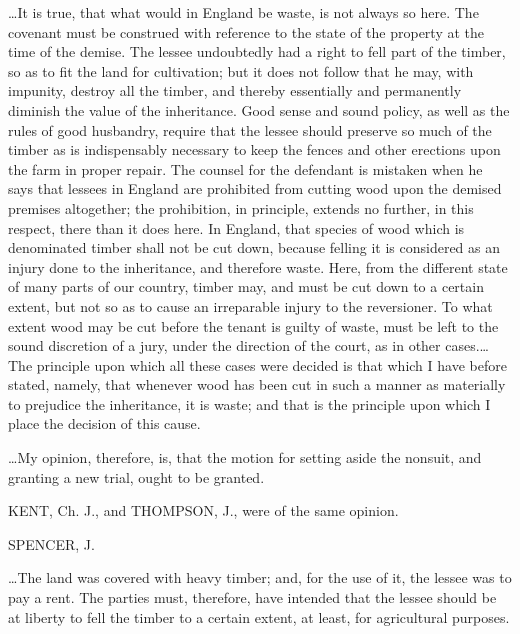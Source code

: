 \dots It is true, that what would in England be waste, is not always so here.
The covenant must be construed with reference to the state of the property at
the time of the demise. The lessee undoubtedly had a right to fell part of the
timber, so as to fit the land for cultivation; but it does not follow that he
may, with impunity, destroy all the timber, and thereby essentially and
permanently diminish the value of the inheritance. Good sense and sound policy,
as well as the rules of good husbandry, require that the lessee should preserve
so much of the timber as is indispensably necessary to keep the fences and
other erections upon the farm in proper repair. The counsel for the defendant
is mistaken when he says that lessees in England are prohibited from cutting
wood upon the demised premises altogether; the prohibition, in principle,
extends no further, in this respect, there than it does here. In England, that
species of wood which is denominated timber shall not be cut down, because
felling it is considered as an injury done to the inheritance, and therefore
waste. Here, from the different state of many parts of our country, timber may,
and must be cut down to a certain extent, but not so as to cause an irreparable
injury to the reversioner. To what extent wood may be cut before the tenant is
guilty of waste, must be left to the sound discretion of a jury, under the
direction of the court, as in other cases.\dots The principle upon which all
these cases were decided is that which I have before stated, namely, that
whenever wood has been cut in such a manner as materially to prejudice the
inheritance, it is waste; and that is the principle upon which I place the
decision of this cause.

\dots My opinion, therefore, is, that the motion for setting aside the nonsuit,
and granting a new trial, ought to be granted.

KENT, Ch. J., and THOMPSON, J., were of the same opinion.

SPENCER, J.

\dots The land was covered with heavy timber; and, for the use of it, the lessee
was to pay a rent. The parties must, therefore, have intended that the lessee
should be at liberty to fell the timber to a certain extent, at least, for
agricultural purposes.


